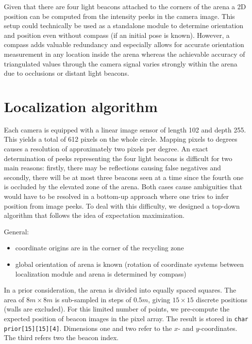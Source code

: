 Given that there are four light beacons attached to the corners of the arena a 
2D position can be computed from the intensity peeks in the camera image.
This setup could technically be used as a standalone module to determine orientation
and position even without compass (if an initial pose is known). However, a compass 
adds valuable redundancy and especially allows for accurate orientation measurement
in any location inside the arena whereas the achievable accuracy of triangulated 
values through the camera signal varies strongly within the arena due to occlusions
or distant light beacons.

\section{Localization algorithm}
Each camera is equipped with a linear image sensor of length 102 and depth 255. This
yields a total of 612 pixels on the whole circle. Mapping pixels to degrees causes a 
resolution of approximately two pixels per degree. An exact determination of peeks 
representing the four light beacons is difficult for two main reasons: firstly, there may be
reflections causing false negatives and secondly, there will be at most three beacons
seen at a time since the fourth one is occluded by the elevated zone of the arena.
Both cases cause ambiguities that would have to be resolved in a bottom-up approach
where one tries to infer position from image peeks. To deal with this difficulty,
we designed a top-down algorithm that follows the idea of expectation maximization.

General:
\begin{itemize}
    \item coordinate origins are in the corner of the recycling zone
    \item global orientation of arena is known (rotation of coordinate systems
        between localization module and arena is determined by compass)
\end{itemize}

In a prior consideration, the arena is divided into equally spaced squares. The area
of $8m \times 8m$ is sub-sampled in steps of $0.5m$, giving $15 \times 15$ discrete 
positions (walls are excluded). For this limited number of points, we pre-compute 
the expected position of beacon images in the pixel array. The result is stored in
\texttt{char prior[15][15][4]}. Dimensions one and two refer to the $x$- and $y$-coordinates.
The third refers two the beacon index.

